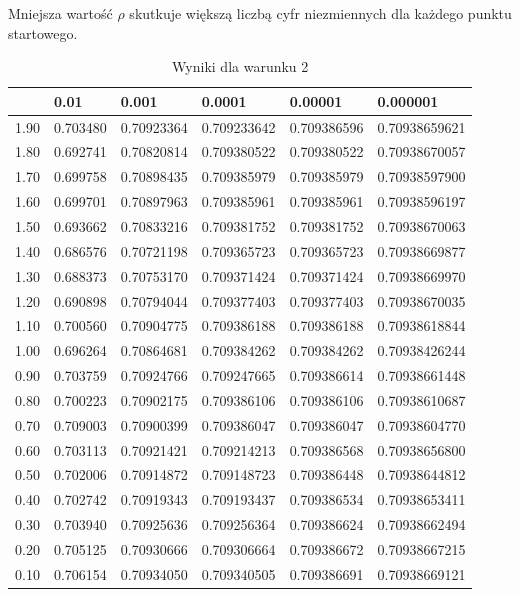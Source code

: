 \documentclass{article}
\begin{document}
Mniejsza wartość $\rho$ skutkuje większą liczbą cyfr niezmiennych dla każdego punktu startowego.

\begin{table}[H]
\centering
\begin{tabular}{|l|l|l|l|l|l|}
\hline
& 0.01 & 0.001 & 0.0001 & 0.00001 & 0.000001 \\ \hline
1.90 & 0.703480 & 0.70923364 & 0.709233642 & 0.709386596 & 0.70938659621 \\ \hline
1.80 & 0.692741 & 0.70820814 & 0.709380522 & 0.709380522 & 0.70938670057 \\ \hline
1.70 & 0.699758 & 0.70898435 & 0.709385979 & 0.709385979 & 0.70938597900 \\ \hline
1.60 & 0.699701 & 0.70897963 & 0.709385961 & 0.709385961 & 0.70938596197 \\ \hline
1.50 & 0.693662 & 0.70833216 & 0.709381752 & 0.709381752 & 0.70938670063 \\ \hline
1.40 & 0.686576 & 0.70721198 & 0.709365723 & 0.709365723 & 0.70938669877 \\ \hline
1.30 & 0.688373 & 0.70753170 & 0.709371424 & 0.709371424 & 0.70938669970 \\ \hline
1.20 & 0.690898 & 0.70794044 & 0.709377403 & 0.709377403 & 0.70938670035 \\ \hline
1.10 & 0.700560 & 0.70904775 & 0.709386188 & 0.709386188 & 0.70938618844 \\ \hline
1.00 & 0.696264 & 0.70864681 & 0.709384262 & 0.709384262 & 0.70938426244 \\ \hline
0.90 & 0.703759 & 0.70924766 & 0.709247665 & 0.709386614 & 0.70938661448 \\ \hline
0.80 & 0.700223 & 0.70902175 & 0.709386106 & 0.709386106 & 0.70938610687 \\ \hline
0.70 & 0.709003 & 0.70900399 & 0.709386047 & 0.709386047 & 0.70938604770 \\ \hline
0.60 & 0.703113 & 0.70921421 & 0.709214213 & 0.709386568 & 0.70938656800 \\ \hline
0.50 & 0.702006 & 0.70914872 & 0.709148723 & 0.709386448 & 0.70938644812 \\ \hline
0.40 & 0.702742 & 0.70919343 & 0.709193437 & 0.709386534 & 0.70938653411 \\ \hline
0.30 & 0.703940 & 0.70925636 & 0.709256364 & 0.709386624 & 0.70938662494 \\ \hline
0.20 & 0.705125 & 0.70930666 & 0.709306664 & 0.709386672 & 0.70938667215 \\ \hline
0.10 & 0.706154 & 0.70934050 & 0.709340505 & 0.709386691 & 0.70938669121 \\ \hline
\end{tabular}
\caption{Wyniki dla warunku 2}
\end{table}
\end{document}
